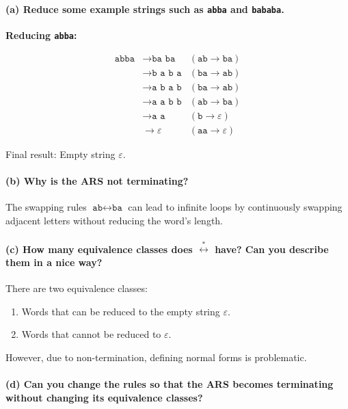 \documentclass{article}
\theoremstyle{theorem}
\theoremstyle{definition}
\theoremstyle{remark}
\begin{document}
\paragraph{(a) Reduce some example strings such as \texttt{abba} and \texttt{bababa}.}

\textbf{Reducing \texttt{abba}:}

\[
\begin{aligned}
\texttt{abba} &\to \texttt{ba ba} &(\texttt{ab} \to \texttt{ba}) \\
&\to \texttt{b a b a} &(\texttt{ba} \to \texttt{ab}) \\
&\to \texttt{a b a b} &(\texttt{ba} \to \texttt{ab}) \\
&\to \texttt{a a b b} &(\texttt{ab} \to \texttt{ba}) \\
&\to \texttt{a a} &(\texttt{b} \to \varepsilon) \\
&\to \varepsilon &(\texttt{aa} \to \varepsilon)
\end{aligned}
\]

Final result: Empty string \(\varepsilon\).

\paragraph{(b) Why is the ARS not terminating?}

The swapping rules \(\texttt{ab} \leftrightarrow \texttt{ba}\) can lead to infinite loops by continuously swapping adjacent letters without reducing the word's length.

\paragraph{(c) How many equivalence classes does \(\stackrel{\ast}{\leftrightarrow}\) have? Can you describe them in a nice way?}

There are two equivalence classes:

\begin{enumerate}
    \item Words that can be reduced to the empty string \(\varepsilon\).
    \item Words that cannot be reduced to \(\varepsilon\).
\end{enumerate}

However, due to non-termination, defining normal forms is problematic.

\paragraph{(d) Can you change the rules so that the ARS becomes terminating without changing its equivalence classes?}
\end{document}
